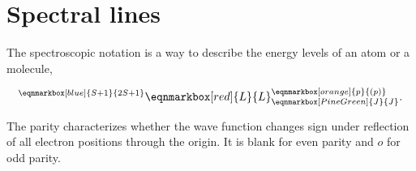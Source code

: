 \chapter{Spectral lines}
The spectroscopic notation is a way to describe the energy levels of an atom or a molecule,
\begin{definition}
\begin{equation}
  ^{\eqnmarkbox[blue]{S+1}{2S+1}}\eqnmarkbox[red]{L}{L}_{\eqnmarkbox[PineGreen]{J}{J}}^{\eqnmarkbox[orange]{p}{(p)}}.
\end{equation}
\end{definition}
The parity characterizes whether the wave function changes sign under reflection of all electron positions through the origin. It is blank for even parity and $o$ for odd parity.
